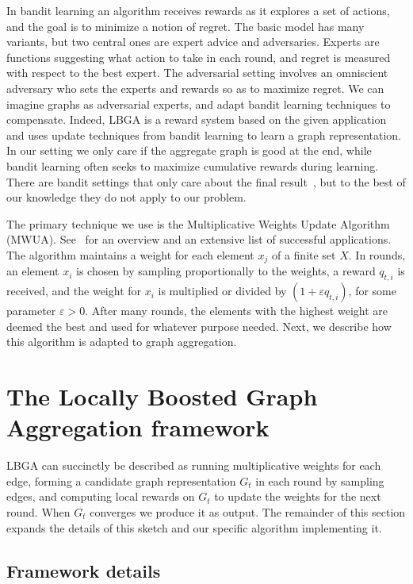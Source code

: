 \documentclass{article}
\begin{document}
In bandit learning an algorithm receives rewards as it explores a set of
actions, and the goal is to minimize a notion of regret. The basic model has
many variants, but two central ones are expert advice and adversaries. Experts
are functions suggesting what action to take in each round, and regret is
measured with respect to the best expert. The adversarial setting involves an
omniscient adversary who sets the experts and rewards so as to maximize regret.
We can imagine graphs as adversarial experts, and adapt bandit learning
techniques to compensate. Indeed, LBGA is a reward system based on the given
application and uses update techniques from bandit learning to learn a graph
representation. In our setting we only care if the aggregate graph is good at
the end, while bandit learning often seeks to maximize cumulative rewards
during learning. There are bandit settings that only care about the final
result~\cite{Bubeck09}, but to the best of our knowledge they do not apply to
our problem. 

The primary technique we use is the Multiplicative Weights Update Algorithm
(MWUA). See~\cite{Arora12} for an overview and an extensive list of successful
applications. The algorithm maintains a weight for each element $x_j$ of a
finite set $X$. In rounds, an element $x_i$ is chosen by sampling
proportionally to the weights, a reward $q_{t,i}$ is received, and the weight
for $x_i$ is multiplied or divided by $(1 + \varepsilon q_{t,i})$, for some
parameter $\varepsilon >0$. After many rounds, the elements with the highest
weight are deemed the best and used for whatever purpose needed. Next, we
describe how this algorithm is adapted to graph aggregation. 

\section{The Locally Boosted Graph Aggregation framework}
\label{sec:lbga}

LBGA can succinctly be described as running multiplicative weights for each
edge, forming a candidate graph representation $G_t$ in each round by sampling
edges, and computing local rewards on $G_t$ to update the weights for the next
round. When $G_t$ converges we produce it as output. The remainder of this
section expands the details of this sketch and our specific algorithm
implementing it. 

\subsection{Framework details}
\label{sec:framework}
\end{document}
